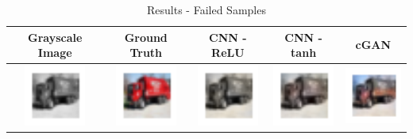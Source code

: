 \documentclass{article}
\begin{document}
\begin{table}[h!]
  \caption{Results - Failed Samples}
  \label{tab:4}
  \centering
  \begin{tabular}{ccccc}
    \toprule
    Grayscale Image & Ground Truth & CNN - ReLU & CNN - tanh & cGAN \\
    \midrule
    \includegraphics[width=2cm]{results3/133-bw.png} & \includegraphics[width=2cm]{results3/133-gt.png} & \includegraphics[width=2cm]{results5/133-relucnn.png} & \includegraphics[width=2cm]{results5/133-tanhcnn.png} & \includegraphics[width=2cm]{results3/133-gan.png} \\

\end{tabular}
\end{table}
\end{document}
